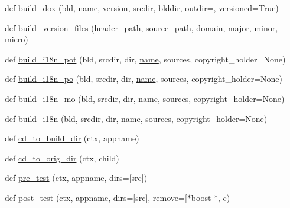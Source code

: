 \begin{DoxyCompactItemize}
\item 
def \hyperlink{namespacewaflib_1_1extras_1_1autowaf_aa326d8cb276e0c9425460e07230fcd6c}{build\+\_\+dox} (bld, \hyperlink{lib_2expat_8h_a1b49b495b59f9e73205b69ad1a2965b0}{name}, \hyperlink{lib_2expat_8h_aec5db107b91447a96c47961ce9df2660}{version}, srcdir, blddir, outdir=\textquotesingle{}\textquotesingle{}, versioned=True)
\item 
def \hyperlink{namespacewaflib_1_1extras_1_1autowaf_a57c006e489535681633401b92f27bff1}{build\+\_\+version\+\_\+files} (header\+\_\+path, source\+\_\+path, domain, major, minor, micro)
\item 
def \hyperlink{namespacewaflib_1_1extras_1_1autowaf_a129b90912f51a7d6b205911e0f9604f9}{build\+\_\+i18n\+\_\+pot} (bld, srcdir, dir, \hyperlink{lib_2expat_8h_a1b49b495b59f9e73205b69ad1a2965b0}{name}, sources, copyright\+\_\+holder=None)
\item 
def \hyperlink{namespacewaflib_1_1extras_1_1autowaf_afcd5d32b2bad38fd561677ee6f803640}{build\+\_\+i18n\+\_\+po} (bld, srcdir, dir, \hyperlink{lib_2expat_8h_a1b49b495b59f9e73205b69ad1a2965b0}{name}, sources, copyright\+\_\+holder=None)
\item 
def \hyperlink{namespacewaflib_1_1extras_1_1autowaf_ad523424cca27d7e95c00bda8ba12daf0}{build\+\_\+i18n\+\_\+mo} (bld, srcdir, dir, \hyperlink{lib_2expat_8h_a1b49b495b59f9e73205b69ad1a2965b0}{name}, sources, copyright\+\_\+holder=None)
\item 
def \hyperlink{namespacewaflib_1_1extras_1_1autowaf_ab124c243bf9c40f170a7246d59428c28}{build\+\_\+i18n} (bld, srcdir, dir, \hyperlink{lib_2expat_8h_a1b49b495b59f9e73205b69ad1a2965b0}{name}, sources, copyright\+\_\+holder=None)
\item 
def \hyperlink{namespacewaflib_1_1extras_1_1autowaf_a4884f8dfa00be5d295c7f18752dc75b7}{cd\+\_\+to\+\_\+build\+\_\+dir} (ctx, appname)
\item 
def \hyperlink{namespacewaflib_1_1extras_1_1autowaf_adf9f42c74875f458c6186ec219c4b9ad}{cd\+\_\+to\+\_\+orig\+\_\+dir} (ctx, child)
\item 
def \hyperlink{namespacewaflib_1_1extras_1_1autowaf_a1e9202262e2d472df9ee49ce81722357}{pre\+\_\+test} (ctx, appname, dirs=\mbox{[}\textquotesingle{}src\textquotesingle{}\mbox{]})
\item 
def \hyperlink{namespacewaflib_1_1extras_1_1autowaf_a592777169c3be423995cb6fef5d9d916}{post\+\_\+test} (ctx, appname, dirs=\mbox{[}\textquotesingle{}src\textquotesingle{}\mbox{]}, remove=\mbox{[}\textquotesingle{}$\ast$boost $\ast$\textquotesingle{}, \hyperlink{rfft2d_test_m_l_8m_ae0323a9039add2978bf5b49550572c7c}{c})

\end{DoxyCompactItemize}
